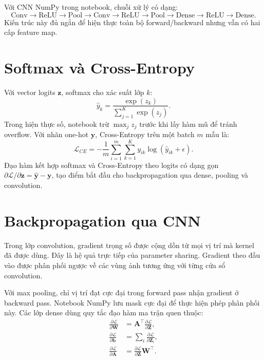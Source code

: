 \documentclass[12pt,a4paper]{report}
\begin{document}
Với CNN NumPy trong notebook, chuỗi xử lý có dạng:
\begin{equation}
\text{Conv} \to \text{ReLU} \to \text{Pool}
\to \text{Conv} \to \text{ReLU} \to \text{Pool}
\to \text{Dense} \to \text{ReLU} \to \text{Dense}.
\end{equation}
Kiến trúc này đủ ngắn để hiện thực toàn bộ forward/backward nhưng vẫn có hai cấp feature map.

\section{Softmax và Cross-Entropy}
Với vector logits $\mathbf{z}$, softmax cho xác suất lớp $k$:
\begin{equation}
    \hat{y}_k=\frac{\exp(z_k)}{\sum_{j=1}^{K}\exp(z_j)}.
\end{equation}
Trong hiện thực số, notebook trừ $\max_j z_j$ trước khi lấy hàm mũ để tránh overflow.
Với nhãn one-hot $\mathbf{y}$, Cross-Entropy trên một batch $m$ mẫu là:
\begin{equation}
    \mathcal{L}_{CE}=-\frac{1}{m}\sum_{i=1}^{m}
    \sum_{k=1}^{K}y_{ik}\log(\hat{y}_{ik}+\epsilon).
\end{equation}
Đạo hàm kết hợp softmax và Cross-Entropy theo logits có dạng gọn
$\partial\mathcal{L}/\partial\mathbf{z}=\hat{\mathbf{y}}-\mathbf{y}$,
tạo điểm bắt đầu cho backpropagation qua dense, pooling và convolution.

\section{Backpropagation qua CNN}
Trong lớp convolution, gradient trọng số được cộng dồn từ mọi vị trí mà kernel đã được dùng.
Đây là hệ quả trực tiếp của parameter sharing.
Gradient theo đầu vào được phân phối ngược về các vùng ảnh tương ứng với từng cửa sổ convolution.

Với max pooling, chỉ vị trí đạt cực đại trong forward pass nhận gradient ở backward pass.
Notebook NumPy lưu mask cực đại để thực hiện phép phân phối này.
Các lớp dense dùng quy tắc đạo hàm ma trận quen thuộc:
\begin{align}
    \frac{\partial\mathcal{L}}{\partial\mathbf{W}}
    &=\mathbf{A}^{\top}\frac{\partial\mathcal{L}}{\partial\mathbf{Z}},\\
    \frac{\partial\mathcal{L}}{\partial\mathbf{b}}
    &=\sum_i\frac{\partial\mathcal{L}}{\partial\mathbf{Z}_i},\\
    \frac{\partial\mathcal{L}}{\partial\mathbf{A}}
    &=\frac{\partial\mathcal{L}}{\partial\mathbf{Z}}\mathbf{W}^{\top}.
\end{align}
\end{document}
